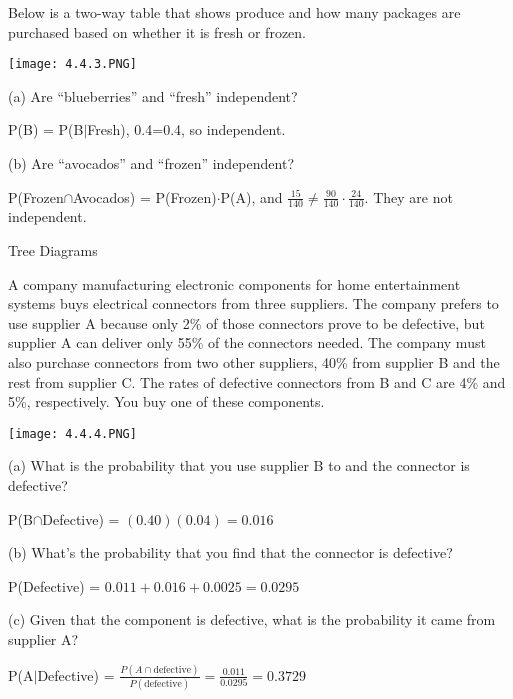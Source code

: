 \documentclass[../stats.tex]{subfiles}
\begin{document}
\begin{example}
    Below is a two-way table that shows produce and how many packages are purchased based on whether it is fresh or frozen.
    \begin{center}
        \texttt{[image: 4.4.3.PNG]}
    \end{center}

    (a) Are ``blueberries'' and ``fresh'' independent?

    P(B) = P(B$|$Fresh), 0.4=0.4, so independent.

    (b) Are ``avocados'' and ``frozen'' independent?

    P(Frozen$\cap$Avocados) = P(Frozen)$\cdot$P(A), and $\frac{15}{140}\neq \frac{90}{140}\cdot\frac{24}{140}$. They are not independent.
\end{example}

Tree Diagrams
\begin{example}
    A company manufacturing electronic components for home entertainment systems buys electrical connectors from three suppliers. The company prefers to use supplier A because only 
    2\% of those connectors prove to be defective, but supplier A can deliver only 55\% of the connectors needed. The company must also purchase connectors from two other suppliers, 40\% from supplier B and the rest from supplier C. The rates of defective connectors from B and C are 4\% and 5\%, respectively. You buy one of these components.
    \begin{center}
        \texttt{[image: 4.4.4.PNG]}
    \end{center}

    (a) What is the probability that you use supplier B to and the connector is defective?
    
    P(B$\cap$Defective) = $(0.40)(0.04)=0.016$

    (b) What's the probability that you find that the connector is defective?

    P(Defective) = $0.011+0.016+0.0025=0.0295$

    (c) Given that the component is defective, what is the probability it came from supplier A?

    P(A$|$Defective) = $\frac{P(A\cap \text{defective})}{P(\text{defective})} = \frac{0.011}{0.0295}=0.3729$
\end{example}
\end{document}
